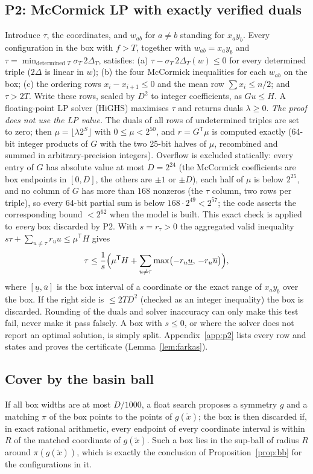 \documentclass[11pt]{amsart}
\theoremstyle{definition}
\begin{document}
\subsection{P2: McCormick LP with exactly verified duals}
Introduce $\tau$, the coordinates, and $w_{ab}$ for $a \ne b$ standing for $x_a y_b$. Every configuration in the box with $f > T$, together with $w_{ab} = x_a y_b$ and $\tau = \min_{\text{determined } T}\sigma_T\, 2\Delta_T$, satisfies:
(a) $\tau - \sigma_T\,2\Delta_T(w) \le 0$ for every determined triple ($2\Delta$ is linear in $w$);
(b) the four McCormick inequalities for each $w_{ab}$ on the box;
(c) the ordering rows $x_i - x_{i+1} \le 0$ and the mean row $\sum x_i \le n/2$;
and $\tau > 2T$. Write these rows, scaled by $D^2$ to integer coefficients, as $Gu \le H$. A floating-point LP solver (HiGHS) maximises $\tau$ and returns duals $\lambda \ge 0$. \emph{The proof does not use the LP value.} The duals of all rows of undetermined triples are set to zero; then $\mu = \lfloor \lambda 2^S\rfloor$ with $0 \le \mu < 2^{50}$, and $r = G^{\mathsf T}\mu$ is computed exactly (64-bit integer products of $G$ with the two 25-bit halves of $\mu$, recombined and summed in arbitrary-precision integers). Overflow is excluded statically: every entry of $G$ has absolute value at most $D = 2^{24}$ (the McCormick coefficients are box endpoints in $[0,D]$, the others are $\pm1$ or $\pm D$), each half of $\mu$ is below $2^{25}$, and no column of $G$ has more than $168$ nonzeros (the $\tau$ column, two rows per triple), so every 64-bit partial sum is below $168\cdot2^{49} < 2^{57}$; the code asserts the corresponding bound $<2^{62}$ when the model is built. This exact check is applied to \emph{every} box discarded by P2. With $s = r_\tau > 0$ the aggregated valid inequality $s\tau + \sum_{u\ne\tau} r_u u \le \mu^{\mathsf T}H$ gives
\[
\tau \le \frac{1}{s}\Bigl(\mu^{\mathsf T}H + \sum_{u\ne\tau}\max\bigl(-r_u \underline u,\, -r_u \overline u\bigr)\Bigr),
\]
where $[\underline u,\overline u]$ is the box interval of a coordinate or the exact range of $x_a y_b$ over the box. If the right side is $\le 2TD^2$ (checked as an integer inequality) the box is discarded. Rounding of the duals and solver inaccuracy can only make this test fail, never make it pass falsely. A box with $s \le 0$, or where the solver does not report an optimal solution, is simply split. Appendix~\ref{app:p2} lists every row and states and proves the certificate (Lemma~\ref{lem:farkas}). %

\subsection{Cover by the basin ball}\label{sec:cover}
If all box widths are at most $D/1000$, a float search proposes a symmetry $g$ and a matching $\pi$ of the box points to the points of $g(\tilde x)$; the box is then discarded if, in exact rational arithmetic, every endpoint of every coordinate interval is within $R$ of the matched coordinate of $g(\tilde x)$. Such a box lies in the sup-ball of radius $R$ around $\pi(g(\tilde x))$, which is exactly the conclusion of Proposition~\ref{prop:bb} for the configurations in it. %
\end{document}
